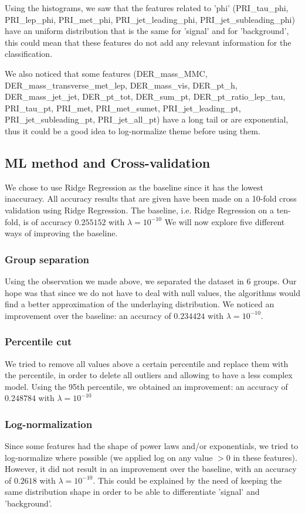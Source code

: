 \documentclass[10pt,conference,compsocconf]{IEEEtran}
\begin{document}
Using the histograms, we saw that the features related to 'phi' (PRI\_tau\_phi,
PRI\_lep\_phi, PRI\_met\_phi, PRI\_jet\_leading\_phi, PRI\_jet\_subleading\_phi)
have an uniform distribution that is the same
for 'signal' and for 'background', this could mean that these features do not add
any relevant information for the classification.

We also noticed that some features (DER\_mass\_MMC, DER\_mass\_transverse\_met\_lep, DER\_mass\_vis, DER\_pt\_h, DER\_mass\_jet\_jet, DER\_pt\_tot, DER\_sum\_pt, DER\_pt\_ratio\_lep\_tau, PRI\_tau\_pt, PRI\_met, PRI\_met\_sumet, PRI\_jet\_leading\_pt, PRI\_jet\_subleading\_pt, PRI\_jet\_all\_pt) have a long tail or are exponential, thus it could be a good
idea to log-normalize theme before using them.

\subsection{ML method and Cross-validation}
We chose to use Ridge Regression as the baseline since it has the lowest
inaccuracy.
All accuracy results that are given have been made on a 10-fold cross validation
using Ridge Regression. The baseline, i.e. Ridge Regression on a ten-fold, is
of accuracy $0.255152$ with $\lambda = 10^{-10}$
We will now explore five different ways of improving the baseline.

\subsubsection{Group separation}
Using the observation we made above, we separated the dataset in 6 groups. Our
hope was that since we do not have to deal with null values, the algorithms
would find a better approximation of the underlaying distribution. We noticed an
improvement over the baseline: an accuracy of $0.234424$ with $\lambda =
10^{-10}$.

\subsubsection{Percentile cut}
We tried to remove all values above a certain percentile and replace them with
the percentile, in order to delete all outliers and allowing to have a less
complex model. Using the 95th percentile, we obtained an improvement: an
accuracy of $0.248784$ with $\lambda = 10^{-10}$

\subsubsection{Log-normalization}
Since some features had the shape of power laws and/or exponentials, we tried to
log-normalize where possible (we applied log on any value $>0$ in these
features). However, it did not result in an improvement over the baseline, with
an accuracy of $0.2618$ with $\lambda = 10^{-10}$. This could be explained by
the need of keeping the same distribution shape in order to be able to
differentiate 'signal' and 'background'.
\end{document}
